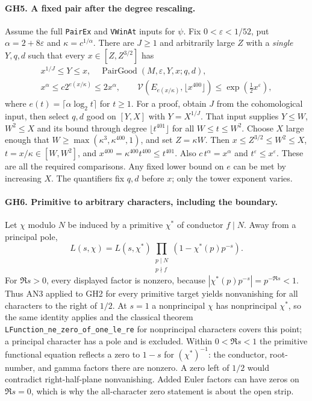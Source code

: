 \documentclass[11pt,a4paper]{article}
\numberwithin{equation}{section}
\theoremstyle{remark}\newtheorem{remark}[theorem]{Remark}
\begin{document}
\paragraph{GH5. A fixed pair after the degree rescaling.}
Assume the full \texttt{PairEx} and \texttt{VWinAt} inputs for $\psi$.
Fix $0<\varepsilon<1/52$, put $\alpha=2+8\varepsilon$ and
$\kappa=c^{1/\alpha}$.  There are $J\ge1$ and arbitrarily large $Z$
with a \emph{single} $Y,q,d$ such that every $x\in[Z,Z^{3/2}]$ has
\[
 \begin{gathered}
 x^{1/J}\le Y\le x,\quad \operatorname{PairGood}(M,\varepsilon,Y,x;q,d),\\
 x^\alpha\le c2^{e(x/\kappa)}\le2x^\alpha,\qquad
 \mathcal V(E_{e(x/\kappa)},\lfloor x^{400}\rfloor)
       \le\exp(\tfrac12x^\varepsilon),
 \end{gathered}                                                    \tag{GH5}
\]
where $e(t)=\lceil\alpha\log_2t\rceil$ for $t\ge1$.
For a proof, obtain $J$ from the cohomological input, then select
$q,d$ good on $[Y,X]$ with $Y=X^{1/J}$.  That input supplies
$Y\le W$, $W^2\le X$ and its bound through degree $\lfloor t^{401}\rfloor$
for all $W\le t\le W^2$.  Choose $X$ large enough that
$W\ge\max(\kappa^3,\kappa^{400},1)$, and set $Z=\kappa W$.
Then $x\le Z^{3/2}\le W^2\le X$, $t=x/\kappa\in[W,W^2]$, and
$x^{400}=\kappa^{400}t^{400}\le t^{401}$.
Also $c\,t^\alpha=x^\alpha$ and $t^\varepsilon\le x^\varepsilon$.
These are all the required comparisons.  Any fixed lower bound on $e$
can be met by increasing $X$.  The quantifiers fix $q,d$ before $x$;
only the tower exponent varies.

\paragraph{GH6. Primitive to arbitrary characters, including the boundary.}
Let $\chi$ modulo $N$ be induced by a primitive $\chi^*$ of conductor
$f\mid N$.  Away from a principal pole,
\[
 L(s,\chi)=L(s,\chi^*)
       \prod_{\substack{p\mid N\\p\nmid f}}
             (1-\chi^*(p)p^{-s}).                         \tag{GH6}
\]
For $\Re s>0$, every displayed factor is nonzero, because
$|\chi^*(p)p^{-s}|=p^{-\Re s}<1$.
Thus AN3 applied to GH2 for every primitive target yields nonvanishing
for all characters to the right of $1/2$.  At $s=1$ a nonprincipal
$\chi$ has nonprincipal $\chi^*$, so the same identity applies and
the classical theorem \texttt{LFunction\_ne\_zero\_of\_one\_le\_re}
for nonprincipal characters covers this point; a principal character
has a pole and is excluded.  Within $0<\Re s<1$ the primitive functional
equation reflects a zero to $1-s$ for $(\chi^*)^{-1}$: the conductor,
root-number, and gamma factors there are nonzero.  A zero left of
$1/2$ would contradict right-half-plane nonvanishing.  Added Euler
factors can have zeros on $\Re s=0$, which is why the all-character
zero statement is about the open strip.
\end{document}
